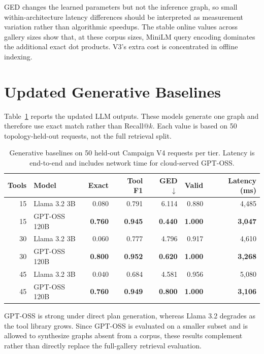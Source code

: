\documentclass{article}
\begin{document}
GED changes the learned parameters but not the inference graph, so small within-architecture latency differences should be interpreted as measurement variation rather than algorithmic speedups. The stable online values across gallery sizes show that, at these corpus sizes, MiniLM query encoding dominates the additional exact dot products. V3's extra cost is concentrated in offline indexing.

\section{Updated Generative Baselines}
\label{sec:llm-results}

Table~\ref{tab:llm_results} reports the updated LLM outputs. These models generate one graph and therefore use exact match rather than Recall@$k$. Each value is based on 50 topology-held-out requests, not the full retrieval split.

\begin{table}[h]
\caption{Generative baselines on 50 held-out Campaign V4 requests per tier. Latency is end-to-end and includes network time for cloud-served GPT-OSS.}
\label{tab:llm_results}
\centering
\small
\begin{tabular}{@{}rlrrrrr@{}}
\toprule
Tools & Model & Exact & Tool F1 & GED $\downarrow$ & Valid & Latency (ms) \\
\midrule
15 & Llama 3.2 3B & 0.080 & 0.791 & 6.114 & 0.880 & 4,485 \\
15 & GPT-OSS 120B & \textbf{0.760} & \textbf{0.945} & \textbf{0.440} & \textbf{1.000} & \textbf{3,047} \\
30 & Llama 3.2 3B & 0.060 & 0.777 & 4.796 & 0.917 & 4,610 \\
30 & GPT-OSS 120B & \textbf{0.800} & \textbf{0.952} & \textbf{0.620} & \textbf{1.000} & \textbf{3,268} \\
45 & Llama 3.2 3B & 0.040 & 0.684 & 4.581 & 0.956 & 5,080 \\
45 & GPT-OSS 120B & \textbf{0.760} & \textbf{0.949} & \textbf{0.800} & \textbf{1.000} & \textbf{3,106} \\
\bottomrule
\end{tabular}
\end{table}

GPT-OSS is strong under direct plan generation, whereas Llama 3.2 degrades as the tool library grows. Since GPT-OSS is evaluated on a smaller subset and is allowed to synthesize graphs absent from a corpus, these results complement rather than directly replace the full-gallery retrieval evaluation.
\end{document}
